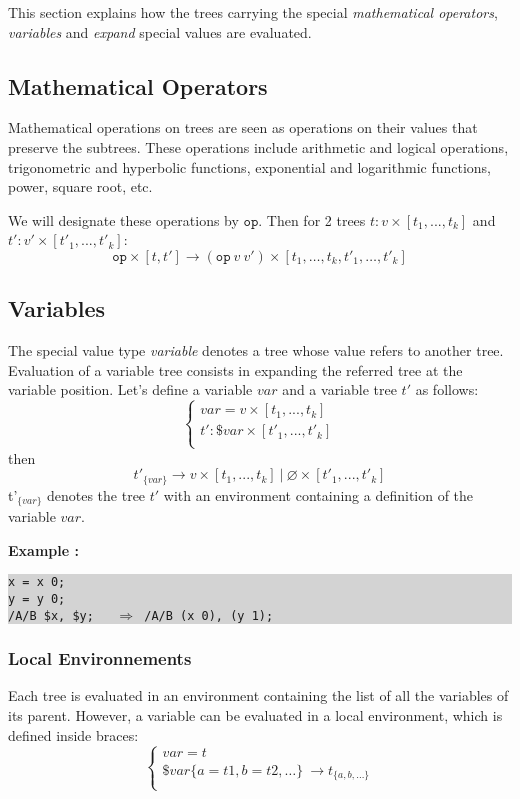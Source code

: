 \documentclass[runningheads,a4paper]{llncs}
\newcommand{\exemple}	{\vspace*{1mm}\hspace*{-4mm}\textbf{Example :}}
\newcommand{\code}	[2][0.9]	{\vspace{0mm}\begin{center}\colorbox{lightgrey}{
							\begin{minipage}[t]{#1\columnwidth} 
							{\small \texttt{#2}}
							\end{minipage}}\end{center}}
\newcommand{\llist}	[1]		{\ensuremath{[#1_1,...,#1_k]}}
\newcommand{\seq}		{\ensuremath{|}}
\newcommand{\forest}	{\ensuremath{\varnothing}}
\newcommand{\binop}		{\ensuremath{\texttt{op}}}
\newcommand{\etc}		{\ensuremath{\text{…}}}
\begin{document}
This section explains how the trees carrying the special \emph{mathematical operators}, \emph{variables} and \emph{expand} special values are evaluated.

\subsection{Mathematical Operators}

Mathematical operations on trees are seen as operations on their values that preserve the subtrees. These operations include arithmetic and logical operations, trigonometric and hyperbolic functions, exponential and logarithmic functions, power, square root, etc.

We will designate these operations by \binop. Then for 2 trees $t : v \times \llist{t}$ and $t' : v' \times \llist{t'}$:
\[
	\binop \times [ t, t']  \to  (\binop\ v\ v') \times [ t_1,\etc,t_k,t'_1,\etc,t'_k ]
\]

\subsection{Variables}
The special value type \emph{variable} denotes a tree whose value refers to another tree.
Evaluation of a variable tree consists in expanding the referred tree at the variable position.
Let's define a variable $var$ and a variable tree $t'$ as follows:
\[
\left\{
\begin{array}{l}
	var = v \times \llist{t} \\
	t' : \$var \times \llist{t'}\\
\end{array}
\right.
\]
then 
\[
	t'_{\{var\}}  \to v \times \llist{t}\ \seq\ \forest \times \llist{t'}
\]
t'$_{\{var\}}$ denotes the tree $t'$ with an environment containing a definition of the variable $var$.

\exemple
\code{x = x 0;\\
y = y 0;\\
/A/B \$x, \$y; \ \ $\Rightarrow$  /A/B (x 0), (y 1);}


\subsubsection{Local Environnements}

Each tree is evaluated in an environment containing the list of all the variables of its parent. However, a variable can be evaluated in a local environment, which is defined inside braces:
\[
\left\{
\begin{array}{l}
	var = t \\
	\$var\{a=t1, b=t2,\etc\} \ \to  t_{\{a, b,\etc\}} \\
\end{array}
\right.
\]
\end{document}
